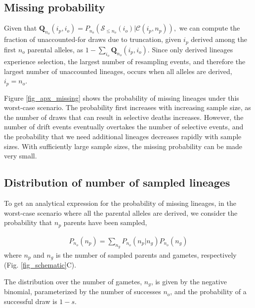 \documentclass[review,nonatbib]{elsarticle}
\begin{document}
\subsection{Missing probability}
\label{subsec_missing}


Given that $ \mathbf{Q}_{n_o}(i_p, i_o) = P_{n_o}(\mathcal{S}_{\leq n_o} (i_o)| \mathcal{C}(i_p,n_p)),$ 
we can compute the fraction of
unaccounted-for draws due to truncation, given $i_p$ derived among the first $n_o$ parental
alleles, as $1-\sum_{i_o} \mathbf{Q}_{n_o}(i_p, i_o).$ Since only derived lineages experience selection, the largest number of resampling events,
and therefore the largest number of unaccounted lineages, occurs when all alleles are derived,
$i_p = n_o$.

Figure \ref{fig_apx_missing} shows the probability of missing lineages under this worst-case scenario. The 
probability first increases with increasing sample size, as the number of draws that can
result in selective deaths increases. However, the number of drift events eventually overtakes the
number of selective events, and the probability that we need additional lineages decreases rapidly
with sample sizes. With sufficiently large sample sizes, the missing probability can be made very small.

\subsection{Distribution of number of sampled lineages}
\label{subsec_distribution}

To get an analytical expression for the probability of missing lineages, in the worst-case scenario
where all the parental alleles are derived, we consider the probability that $n_p$ parents have been
sampled,

\begin{equation}
  \begin{aligned}
    \label{eq_conditional}
    P_{n_o}(n_p) = \sum_{n_g} P_{n_o}(n_p | n_g)P_{n_o}(n_g) 
  \end{aligned}
\end{equation}
where $n_p$ and $n_g$ is the number of sampled parents and gametes, respectively (Fig.
\ref{fig_schematic}C). 

The distribution over the number of gametes, $n_g$, is given by the negative binomial,
parameterized by the number of successes $n_o$, and the probability of a successful draw is $1-s$.
\end{document}
